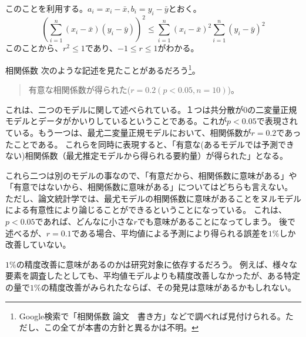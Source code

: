 このことを利用する。$a_i=x_i-\bar{x},b_i=y_i-\bar{y}$とおく。
\begin{equation*}
 \left(\sum_{i=1}^n (x_i-\bar{x})(y_i-\bar{y})\right)^2 \leq  \sum_{i=1}^n(x_i-\bar{x})^2\sum_{i=1}^n(y_i-\bar{y})^2
\end{equation*}
このことから、$r^2\leq 1$であり、$-1\leq r \leq 1$がわかる。


%



\begin{SMbox}{相関係数}
 次のような記述を見たことがあるだろう\footnote{Google検索で「相関係数 論文　書き方」などで調べれば見付けられる。ただし、この全てが本書の方針と異るかは不明。}。
\begin{quote}
 有意な相関係数が得られた($r=0.2(p<0.05,n=10)$)。
\end{quote}
これは、二つのモデルに関して述べられている。１つは共分散が$0$の二変量正規モデルとデータがかいりしているということである。これが$p<0.05$で表現されている。もう一つは、最尤二変量正規モデルにおいて、相関係数が$r=0.2$であったことである。
 これらを同時に表現すると、「有意な(あるモデルでは予測できない)相関係数（最尤推定モデルから得られる要約量）が得られた」となる。
 
 これら二つは別のモデルの事なので、「有意だから、相関係数に意味がある」や「有意ではないから、相関係数に意味がある」についてはどちらも言えない。
 ただし、論文統計学では、最尤モデルの相関係数に意味があることをヌルモデルによる有意性により論じることができるということになっている。
 これは、$p<0.05$であれば、どんなに小さな$r$でも意味があることになってしまう。
 後で述べるが、$r=0.1$である場合、平均値による予測により得られる誤差を$1\%$しか改善していない。

 $1\%$の精度改善に意味があるのかは研究対象に依存するだろう。
 例えば、様々な要素を調査したとしても、平均値モデルよりも精度改善しなかったが、ある特定の量で$1\%$の精度改善がみられたならば、その発見は意味があるかもしれない。
\end{SMbox}

